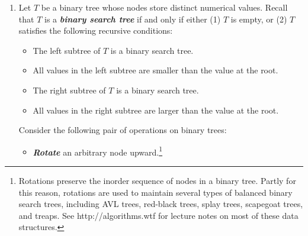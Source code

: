 \begin{exercises}
\begin{enumerate}[label=\arabic*.,ref=\thechapter.\arabic*,leftmargin=*,align=left,itemsep=1.5ex plus 0.5ex,resume]
\begin{center}
\begin{minipage}[t]{0.33\linewidth}
\begin{pseudocode}
if $v = \Const{Null}$\\
\Indent return\\
else\\
\Indent {}$(\Var{left}(v))$\\
\Indent print $(v)$\\
\Indent {}$(\Var{right}(v))$
\end{pseudocode}
\end{minipage}\hfill
\begin{minipage}[t]{0.33\linewidth}
\begin{pseudocode}
\footnotesize{}\\
if $v = \Const{Null}$\\
\Indent return\\
else\\
\Indent {}$(\Var{left}(v))$\\
\Indent {}$(\Var{right}(v))$\\
\Indent print $(v)$
\end{pseudocode}
\end{minipage}
\end{center}
\item {} Let $T$ be a binary tree whose nodes store distinct numerical values. Recall that $T$ is a \textbf{\textit{binary search tree}} if and only if either (1) $T$ is empty, or (2) $T$ satisfies the following recursive conditions:
\begin{itemize}
\item The left subtree of $T$ is a binary search tree.
\item All values in the left subtree are smaller than the value at the root.
\item The right subtree of $T$ is a binary search tree.
\item All values in the right subtree are larger than the value at the root.
\end{itemize}
Consider the following pair of operations on binary trees:
\begin{itemize}
\item \textbf{\textit{Rotate}} an arbitrary node upward.\footnote{Rotations preserve the inorder sequence of nodes in a binary tree. Partly for this reason, rotations are used to maintain several types of balanced binary search trees, including AVL trees, red-black trees, splay trees, scapegoat trees, and treaps. See http://algorithms.wtf for lecture notes on most of these data structures.}

\end{itemize}
\end{enumerate}
\end{exercises}
